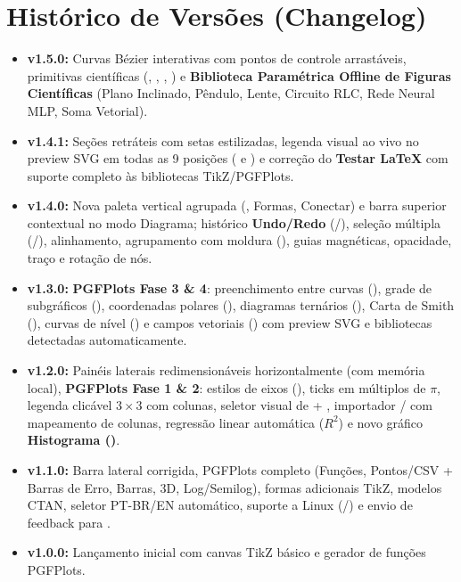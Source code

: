 \documentclass[11pt,a4paper]{article}
\begin{document}
\section{Histórico de Versões (Changelog)}
\begin{itemize}
  \item \textbf{v1.5.0:} Curvas Bézier interativas com pontos de controle arrastáveis, primitivas científicas (, , , ) e \textbf{Biblioteca Paramétrica Offline de Figuras Científicas} (Plano Inclinado, Pêndulo, Lente, Circuito RLC, Rede Neural MLP, Soma Vetorial).
  \item \textbf{v1.4.1:} Seções retráteis com setas estilizadas, legenda visual ao vivo no preview SVG em todas as 9 posições ( e ) e correção do \textbf{Testar LaTeX} com suporte completo às bibliotecas TikZ/PGFPlots.
  \item \textbf{v1.4.0:} Nova paleta vertical agrupada (, Formas, Conectar) e barra superior contextual no modo Diagrama; histórico \textbf{Undo/Redo} (/), seleção múltipla (/), alinhamento, agrupamento com moldura (), guias magnéticas, opacidade, traço e rotação de nós.
  \item \textbf{v1.3.0:} \textbf{PGFPlots Fase 3 \& 4}: preenchimento entre curvas (), grade de subgráficos (), coordenadas polares (), diagramas ternários (), Carta de Smith (), curvas de nível () e campos vetoriais () com preview SVG e bibliotecas detectadas automaticamente.
  \item \textbf{v1.2.0:} Painéis laterais redimensionáveis horizontalmente (com memória local), \textbf{PGFPlots Fase 1 \& 2}: estilos de eixos (), ticks em múltiplos de $\pi$, legenda clicável $3 \times 3$ com colunas, seletor visual de  + , importador / com mapeamento de colunas, regressão linear automática ($R^2$) e novo gráfico \textbf{Histograma ()}.
  \item \textbf{v1.1.0:} Barra lateral corrigida, PGFPlots completo (Funções, Pontos/CSV + Barras de Erro, Barras, 3D, Log/Semilog), formas adicionais TikZ, modelos CTAN, seletor PT-BR/EN automático, suporte a Linux (/) e envio de feedback para .
  \item \textbf{v1.0.0:} Lançamento inicial com canvas TikZ básico e gerador de funções PGFPlots.
\end{itemize}
\end{document}
